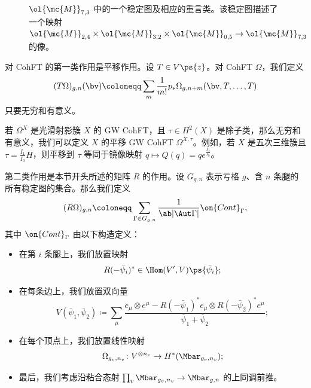 \begin{figure}[htpb]
  \centering
  \caption{$\ol{\mc{M}}_{7,3}$ 中的一个稳定图及相应的重言类。该稳定图描述了一个映射
    $\ol{\mc{M}}_{2,4} \times \ol{\mc{M}}_{3,2} \times \ol{\mc{M}}_{0,5} \to \ol{\mc{M}}_{7,3}$ 的像。}
  \label{fig:stablegraph}
\end{figure}

对 CohFT 的第一类作用是平移作用。设 $T \in V\ps{z}$。对 CohFT $\Omega$，我们定义
\[ (T\Omega)_{g,n}(\bv) \coloneqq \sum_m \frac{1}{m!} p_* \Omega_{g,n+m}(\bv, T,\ldots,T) \]
只要无穷和有意义。

\begin{exm}
    若 $\Omega^X$ 是光滑射影簇 $X$ 的 GW CohFT，且 $\tau \in H^2(X)$ 是除子类，那么无穷和有意义，我们可以定义 $X$ 的平移 GW CohFT $\Omega^{X,\tau}$。例如，若 $X$ 是五次三维簇且 $\tau = \frac{I_1}{I_0} H$，则平移到 $\tau$ 等同于镜像映射 $q \mapsto Q(q) = q e^{\frac{I_1}{I_0}}$。
\end{exm}

第二类作用是本节开头所述的矩阵 $R$ 的作用。设 $G_{g,n}$ 表示亏格 $g$、含 $n$ 条腿的所有稳定图的集合。那么我们定义
\[ (R\Omega)_{g,n} \coloneqq \sum_{\Gamma \in G_{g,n}} \frac{1}{\ab|\Aut \Gamma|} \on{Cont}_{\Gamma}, \]
其中 $\on{Cont}_{\Gamma}$ 由以下构造定义：
\begin{itemize}
    \item 在第 $i$ 条腿上，我们放置映射
        \[ R(-\bar{\psi}_i)^* \in \Hom(V',V) \ps{\bar{\psi}_i}; \]
    \item 在每条边上，我们放置双向量
        \[ V(\bar{\psi}_1, \bar{\psi}_2) \coloneqq \sum_{\mu} \frac{e_{\mu} \otimes e^{\mu} - R(-\bar{\psi}_1)^* e_{\mu} \otimes R(-\bar{\psi}_2)^* e^{\mu}}{\bar{\psi}_1 + \bar{\psi}_2}; \]
    \item 在每个顶点上，我们放置线性映射
        \[ \Omega_{g_v, n_v} \colon V^{\otimes n_v} \to H^*(\Mbar_{g_v, n_v}); \]
    \item 最后，我们考虑沿粘合态射 $\prod_v \Mbar_{g_v, n_v} \to \Mbar_{g,n}$ 的上同调前推。
\end{itemize}

